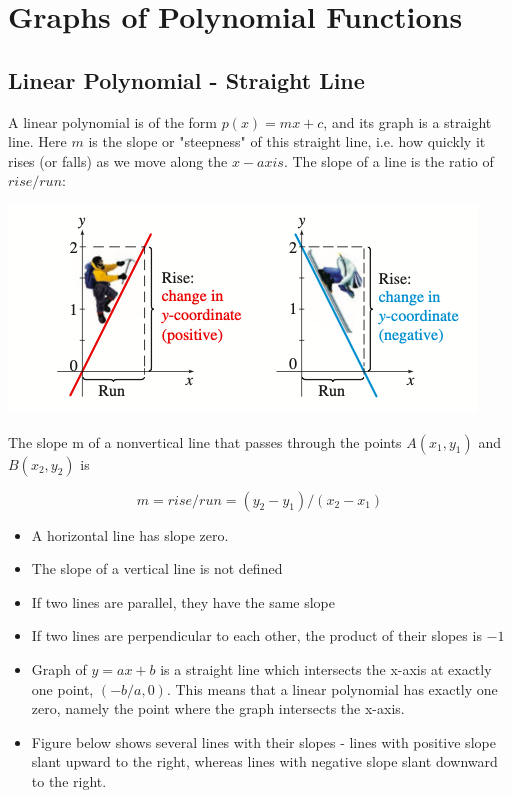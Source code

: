\documentclass{book}
\begin{document}
	\chapter{Graphs of Polynomial Functions}
	\section{Linear Polynomial - Straight Line}
	A linear polynomial is of the form $p(x) = mx + c$, and its graph is a straight line. Here $m$ is the slope or "steepness" of this straight line, i.e. how quickly it rises (or falls) as we move along the $x-axis$. The slope of a line is the ratio of $rise/run$:
	
	\includegraphics[scale=0.7]{slope1}

	The slope m of a nonvertical line that passes through the points $A(x_1,y_1)$ and $B(x_2,y_2)$ is
	
	$$m = rise/run = (y_2-y_1)/(x_2-x_1)$$
	
	\begin{itemize}
		\item A horizontal line has slope zero.
		\item The slope of a vertical line is not defined
		\item If two lines are parallel, they have the same slope
		\item If two lines are perpendicular to each other, the product of their slopes is $-1$
		\item Graph of $y = ax + b$ is a straight line which intersects the x-axis at exactly one point, $(-b/a,0)$. This means that a linear polynomial has exactly one zero, namely the point where the graph intersects the x-axis.
		\item Figure below shows several lines with their slopes - lines with positive slope slant upward to the right, whereas lines with negative slope slant downward to the right.
	\end{itemize}
	
\end{document}
